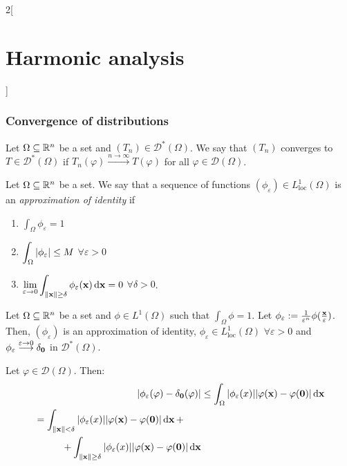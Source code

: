 \documentclass[../../../main_math.tex]{subfiles}
\begin{document}
\begin{multicols}{2}[\section{Harmonic analysis}]
  \subsubsection{Convergence of distributions}
  \begin{definition}
    Let $\Omega\subseteq \mathbb{R}^n$ be a set and $(T_n)\in \mathcal{D}^*(\Omega)$. We say that $(T_n)$ converges to $T\in\mathcal{D}^*(\Omega)$ if $T_n(\varphi)\overset{n\to\infty}{\longrightarrow}T(\varphi)$ for all $\varphi\in\mathcal{D}(\Omega)$.
  \end{definition}
  \begin{definition}
    Let $\Omega\subseteq \mathbb{R}^n$ be a set. We say that a sequence of functions $(\phi_\varepsilon)\in L_\mathrm{loc}^1(\Omega)$ is an \emph{approximation of identity} if
    \begin{enumerate}
      \item $\displaystyle\int_\Omega \phi_\varepsilon=1$
      \item $\displaystyle\int_\Omega \abs{\phi_\varepsilon}\leq M$ $\forall \varepsilon>0$
      \item $\displaystyle\lim_{\varepsilon\to 0}\int_{\left\|\boldsymbol{\mathrm{x}}\right\|\geq \delta}\phi_\varepsilon(\boldsymbol{\mathrm{x}})\dd{\boldsymbol{\mathrm{x}}}=0$ $\forall \delta>0$.
    \end{enumerate}
  \end{definition}
  \begin{proposition}
    Let $\Omega\subseteq \mathbb{R}^n$ be a set and $\phi\in L^1(\Omega)$ such that $\int_\Omega\phi=1$. Let $\phi_\varepsilon:=\frac{1}{\varepsilon^n}\phi(\frac{\boldsymbol{\mathrm{x}}}{\varepsilon})$. Then, $(\phi_\varepsilon)$ is an approximation of identity, $\phi_\varepsilon \in L_\mathrm{loc}^1(\Omega)$ $\forall \varepsilon>0$ and $\phi_\varepsilon\overset{\varepsilon\to 0}{\longrightarrow} \delta_{\boldsymbol{\mathrm{0}}}$ in $\mathcal{D}^*(\Omega)$.
  \end{proposition}
  \begin{sproof}
    Let $\varphi\in\mathcal{D}(\Omega)$. Then:
    \begin{align*}
      \abs{\phi_\varepsilon(\varphi)-\delta_{\vf{0}}(\varphi)} & \leq \int_\Omega \abs{\phi_\varepsilon(x)}\abs{\varphi(\vf{x})-\varphi(\vf{0})}\dd{\vf{x}} \\
      \begin{split}
        & =\int_{\norm{\vf{x}}<\delta} \abs{\phi_\varepsilon(x)}\abs{\varphi(\vf{x})-\varphi(\vf{0})}\dd{\vf{x}}+\\
        &\hspace{1cm}+\int_{\norm{\vf{x}}\geq\delta} \abs{\phi_\varepsilon(x)}\abs{\varphi(\vf{x})-\varphi(\vf{0})}\dd{\vf{x}}

\end{split}
\end{align*}
\end{sproof}
\end{multicols}
\end{document}
